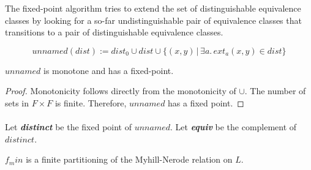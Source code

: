                                    The fixed-point algorithm tries to extend the set of distinguishable equivalence classes by looking for a so-far undistinguishable pair of equivalence classes that transitions to a pair of distinguishable equivalence classes.

                                    \begin{definition}
                                        \[
                                            unnamed(dist) := dist_0 \cup dist \cup \{ (x,y) \, | \, \exists a. \, ext_a(x,y) \in dist\}
                                            \]
                                        \end{definition}

                                        \begin{lemma}
                                            \label{dist_monotone}
                                            $unnamed$ is monotone and has a fixed-point.
                                        \end{lemma}
                                        \begin{proof}
                                            Monotonicity follows directly from the monotonicity of $\cup$. 
                                            The number of sets in $F \times F$ is finite. 
                                            Therefore, $unnamed$ has a fixed point.

                                        \end{proof}
                                        \paragraph{}
                                        Let \textit{\textbf{distinct}} be the fixed point of $unnamed$.
                                        Let \textit{\textbf{equiv}} be the complement of $distinct$.
                                        \begin{theorem}
                                            \label{MN_MIN}
                                            $f_min$ is a finite partitioning of the Myhill-Nerode relation on $L$.
                                        \end{theorem}




